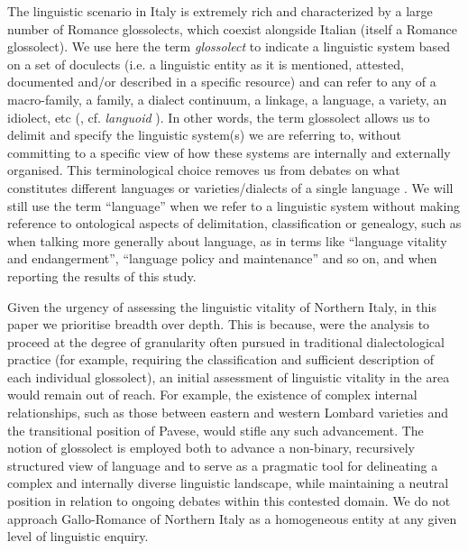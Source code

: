 \documentclass[a4paper,11pt]{article}
\begin{document}
The linguistic scenario in Italy is extremely rich and characterized by a large number of Romance glossolects, which coexist alongside Italian (itself a Romance glossolect). We use here the term \textit{glossolect} to indicate a linguistic system based on a set of doculects (i.e. a linguistic entity as it is mentioned, attested, documented and/or described in a specific resource) and can refer to any of a macro-family, a family, a dialect continuum, a linkage, a language, a variety, an idiolect, etc (\citealp{coretta2024}, cf. \textit{languoid} \citealp{cysouw2013}). In other words, the term glossolect allows us to delimit and specify the linguistic system(s) we are referring to, without committing to a specific view of how these systems are internally and externally organised. This terminological choice removes us from debates on what constitutes different languages or varieties/dialects of a single language \citep{vanrooy2021}. We will still use the term ``language'' when we refer to a linguistic system without making reference to ontological aspects of delimitation, classification or genealogy, such as when talking more generally about language, as in terms like ``language vitality and endangerment'', ``language policy and maintenance'' and so on, and when reporting the results of this study.

Given the urgency of assessing the linguistic vitality of Northern Italy, in this paper we prioritise breadth over depth. This is because, were the analysis to proceed at the degree of granularity often pursued in traditional dialectological practice (for example, requiring the classification and sufficient description of each individual glossolect), an initial assessment of linguistic vitality in the area would remain out of reach. For example, the existence of complex internal relationships, such as those between eastern and western Lombard varieties and the transitional position of Pavese, would stifle any such advancement. The notion of glossolect is employed both to advance a non-binary, recursively structured view of language and to serve as a pragmatic tool for delineating a complex and internally diverse linguistic landscape, while maintaining a neutral position in relation to ongoing debates within this contested domain. We do not approach Gallo-Romance of Northern Italy as a homogeneous entity at any given level of linguistic enquiry.
\end{document}
